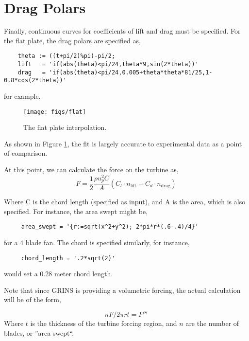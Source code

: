 \newpage
\section{Drag Polars}

Finally, continuous curves for coefficients of lift and drag 
must be specified. 
For the flat plate, the drag polars are specified as,

\begin{lstlisting}
    theta := ((t+pi/2)%pi)-pi/2; 
    lift   = 'if(abs(theta)<pi/24,theta*9,sin(2*theta))'
    drag   = 'if(abs(theta)<pi/24,0.005+theta*theta*81/25,1-0.8*cos(2*theta))'
\end{lstlisting}
for example. 

\begin{figure}[!htb]
  \begin{center}
    \texttt{[image: figs/flat]}
    \caption{The flat plate interpolation.} 
    \label{flat}
  \end{center}
\end{figure}
As shown in Figure \ref{flat}, the fit is largely accurate to experimental data
as a point of comparison. 

At this point, we can calculate the force 
on the turbine as, 
\begin{equation}
 \boxed{F = \frac{1}{2}\frac{\rho u_p^2 C}{A}\left(C_l \cdot
					      n_\text{lift} + C_d \cdot n_\text{drag}  \right)}
\end{equation}

Where C is the chord length (specified as input), and A is the area,
which is also specified. For instance, the area swept might be, 
\begin{lstlisting}
     area_swept = '{r:=sqrt(x^2+y^2); 2*pi*r*(.6-.4)/4}'
\end{lstlisting}
for a 4 blade fan. The chord is specified similarly, for instance, 
\begin{lstlisting}
     chord_length = '.2*sqrt(2)'
\end{lstlisting}
would set a 0.28 meter chord length. 

Note that since GRINS is providing a volumetric forcing, 
the actual calculation will be of the form,

\begin{equation}
 \boxed{n F / 2 \pi r t = F'''}
\end{equation}
Where $t$ is the thickness of the turbine forcing region, and $n$ are the number of blades, 
or ''area swept``.